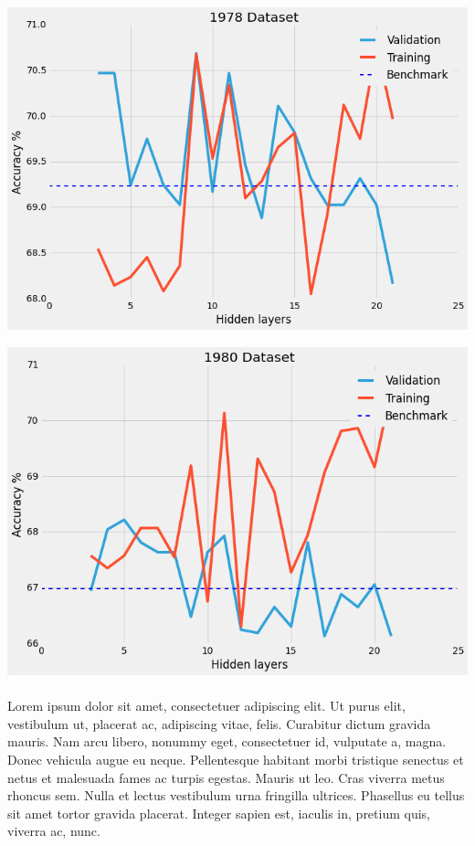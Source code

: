 \documentclass[a4paper]{article}
\theoremstyle{plain}
\begin{document}
\begin{center}\vspace{1cm}
\includegraphics[width=0.9\linewidth]{1978}
\end{center}\vspace{1cm}

\begin{center}\vspace{1cm}
\includegraphics[width=0.9\linewidth]{1980}
\end{center}\vspace{1cm}


\paragraph{}
Lorem ipsum dolor sit amet, consectetuer adipiscing elit. Ut purus elit, vestibulum ut, placerat ac, adipiscing vitae, felis. Curabitur dictum gravida mauris. Nam arcu libero, nonummy eget, consectetuer id, vulputate a, magna. Donec vehicula augue eu neque. Pellentesque habitant morbi tristique senectus et netus et malesuada fames ac turpis egestas. Mauris ut leo. Cras viverra metus rhoncus sem. Nulla et lectus vestibulum urna fringilla ultrices. Phasellus eu tellus sit amet tortor gravida placerat. Integer sapien est, iaculis in, pretium quis, viverra ac, nunc.
\end{document}
